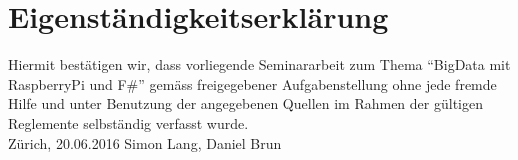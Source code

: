 
\chapter*{Eigenständigkeitserklärung}
\thispagestyle{empty}
%
Hiermit bestätigen wir, dass vorliegende Seminararbeit zum Thema "`BigData mit RaspberryPi und F\#"'
gemäss freigegebener Aufgabenstellung ohne jede fremde Hilfe und unter Benutzung der angegebenen Quellen im Rahmen der gültigen Reglemente selbständig verfasst wurde. 
%
\mbox{}\vspace{4\baselineskip}\\
%
Zürich, 20.06.2016 \hfill Simon Lang, Daniel Brun
\clearpage\mbox{}\thispagestyle{empty}


%


